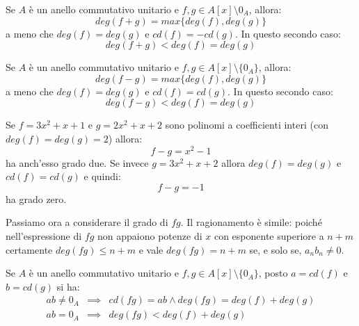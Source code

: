 \begin{propbox}
	Se $A$ è un anello commutativo unitario e $f,g \in A[x] \setminus 0_{A}$, allora:
	\begin{equation}
		deg(f+g)=max \{deg(f),deg(g)\}
	\end{equation}
	a meno che $deg(f)=deg(g)$ e $cd(f)=-cd(g)$. In questo secondo caso:
	\begin{equation}
		deg(f+g)<deg(f)=deg(g)
	\end{equation}
\end{propbox}


\begin{propbox}
	Se $A$ è un anello commutativo unitario e $f,g \in A[x] \setminus \{0_{A}\}$, allora:
	\begin{equation}
		deg(f-g) = max\{deg(f),deg(g)\}
	\end{equation}
	a meno che $deg(f)=deg(g)$ e $cd(f)=cd(g)$. In questo secondo caso:
	\begin{equation}
		deg(f-g)<deg(f)=deg(g)
	\end{equation}
\end{propbox}


\begin{example}
	Se $f=3x^{2}+x+1$ e $g=2x^{2}+x+2$ sono polinomi a coefficienti interi (con $deg(f)=deg(g)=2$) allora:
	\begin{displaymath}
		f-g=x^{2}-1
	\end{displaymath}
	ha anch'esso grado due. Se invece $g=3x^{2}+x+2$ allora $deg(f)=deg(g)$ e $cd(f)=cd(g)$ e quindi:
	\begin{displaymath}
		f-g=-1
	\end{displaymath}
	ha grado zero.
\end{example}

Passiamo ora a considerare il grado di $fg$. Il ragionamento è simile: poiché nell'espressione di $fg$ non appaiono potenze di $x$ con esponente superiore a $n+m$ certamente $deg(fg)\leq n+m$ e vale $deg(fg) = n+m$ se, e solo se, $a_{n}b_{n} \neq 0$.


\begin{propbox}
	Se $A$ è un anello commutativo unitario e $f,g \in A[x] \setminus \{0_{A}\}$, posto $a=cd(f)$ e $b=cd(g)$ si ha:
	\begin{eqnarray}
		ab \neq 0_{A} &\implies& cd(fg)=ab \land deg(fg)=deg(f)+deg(g) \label{eq:regola_add_gradi}\\
		ab = 0_{A} &\implies& deg(fg)<deg(f)+deg(g)
	\end{eqnarray}
\end{propbox}


